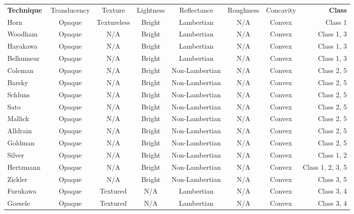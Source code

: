 \begin{sidewaystable}[h]
  \centering
  \begin{tabular}{l*{6}{c}r}
  \hline
  \textbf{Technique} & Translucency & Texture & Lightness & Reflectance & Roughness & Concavity & \textbf{Class}\\
  Horn~\cite{horn1970shape} & Opaque & Textureless & Bright & Lambertian & N/A & Convex & Class 1\\
  Woodham~\cite{woodham1980photometric} & Opaque & N/A & Bright & Lambertian & N/A & Convex & Class 1, 3\\
  Hayakawa~\cite{hayakawa1994photometric} & Opaque & N/A & Bright & Lambertian & N/A & Convex & Class 1, 3\\
  Belhumeur~\cite{belhumeur1999bas} & Opaque & N/A & Bright & Lambertian & N/A & Convex & Class 1, 3\\
  Coleman~\cite{coleman1982obtaining} & Opaque & N/A & Bright & Non-Lambertian & N/A & Convex & Class 2, 5\\
  Barsky~\cite{barsky20034} & Opaque & N/A & Bright & Non-Lambertian & N/A & Convex & Class 2, 5\\
  Schluns~\cite{schluns1993photometric} & Opaque & N/A & Bright & Non-Lambertian & N/A & Convex & Class 2, 5\\
  Sato~\cite{sato1994temporal} & Opaque & N/A & Bright & Non-Lambertian & N/A & Convex & Class 2, 5\\
  Mallick~\cite{mallick2005beyond} & Opaque & N/A & Bright & Non-Lambertian & N/A & Convex & Class 2, 5\\
  Alldrain~\cite{alldrin2008photometric} & Opaque & N/A & Bright & Non-Lambertian & N/A & Convex & Class 2, 5\\
  Goldman~\cite{goldman2010shape} & Opaque & N/A & Bright & Non-Lambertian & N/A & Convex & Class 2, 5\\
  Silver~\cite{silver1980determining} & Opaque & N/A & Bright & Non-Lambertian & N/A & Convex & Class 1, 2\\
  Hertzmann~\cite{hertzmann2005example} & Opaque & N/A & Bright & Non-Lambertian & N/A & Convex & Class 1, 2, 3, 5\\
  Zickler~\cite{zickler2002helmholtz} & Opaque & N/A & Bright & Non-Lambertian & N/A & Convex & Class 3, 5\\
  Furukawa~\cite{furukawa2010accurate} & Opaque & Textured & N/A & Lambertian & N/A & Convex & Class 3, 4\\
  Goesele~\cite{goesele2006multi} & Opaque & Textured & N/A & Lambertian & N/A & Convex & Class 3, 4\\

\end{tabular}
\end{sidewaystable}
